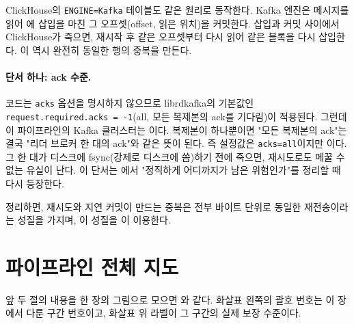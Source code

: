 ClickHouse의 \texttt{ENGINE=Kafka} 테이블도 같은 원리로 동작한다. Kafka 엔진은
메시지를 읽어 에 삽입을 마친 
그 오프셋(offset, 읽은 위치)을 커밋한다. 삽입과 커밋 사이에서 ClickHouse가 죽으면,
재시작 후 같은 오프셋부터 다시 읽어 같은 블록을 다시 삽입한다. 이 역시 완전히 동일한
행의 중복을 만든다.

\paragraph{단서 하나: ack 수준.} 코드는 \texttt{acks} 옵션을 명시하지 않으므로
librdkafka의 기본값인 \texttt{request.required.acks = -1}(all, 모든 복제본의 ack를
기다림)이 적용된다. 그런데 이 파이프라인의 Kafka 클러스터는 이다. 복제본이 하나뿐이면 "모든 복제본의 ack"는 결국 "리더
브로커 한 대의 ack"와 같은 뜻이 된다. 즉 설정값은 \texttt{acks=all}이지만 이다. 그 한 대가 디스크에 fsync(강제로 디스크에 씀)하기 전에
죽으면, 재시도로도 메꿀 수 없는 유실이 난다. 이 단서는 에서
"정직하게 어디까지가 남은 위험인가"를 정리할 때 다시 등장한다.

정리하면, 
재시도와 지연 커밋이 만드는 중복은 전부 바이트 단위로 동일한 재전송이라는 성질을
가지며, 이 성질을 이 이용한다.

\section{파이프라인 전체 지도}
\label{sec:delivery-map}

앞 두 절의 내용을 한 장의 그림으로 모으면 와 같다. 화살표
왼쪽의 괄호 번호는 이 장에서 다룬 구간 번호이고, 화살표 위 라벨이 그 구간의 실제
보장 수준이다.

